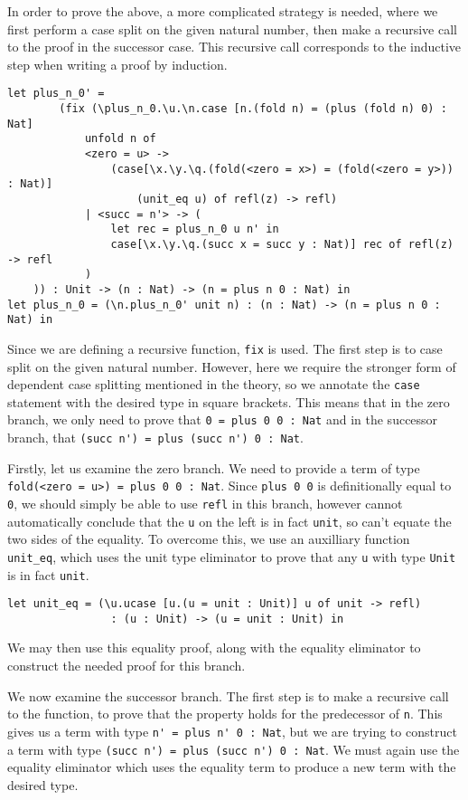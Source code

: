 \documentclass[12pt,a4paper,twoside]{report}
\begin{document}
In order to prove the above, a more complicated strategy is needed, where we first perform a case split on the given natural number, then make a recursive call to the proof in the successor case.
This recursive call corresponds to the inductive step when writing a proof by induction.
\begin{lstlisting}[gobble=4]
    let plus_n_0' =
        (fix (\plus_n_0.\u.\n.case [n.(fold n) = (plus (fold n) 0) : Nat]
            unfold n of
            <zero = u> -> 
                (case[\x.\y.\q.(fold(<zero = x>) = (fold(<zero = y>)) : Nat)]
                    (unit_eq u) of refl(z) -> refl)
            | <succ = n'> -> (
                let rec = plus_n_0 u n' in
                case[\x.\y.\q.(succ x = succ y : Nat)] rec of refl(z) -> refl
            )
    )) : Unit -> (n : Nat) -> (n = plus n 0 : Nat) in
let plus_n_0 = (\n.plus_n_0' unit n) : (n : Nat) -> (n = plus n 0 : Nat) in
\end{lstlisting}
Since we are defining a recursive function, \texttt{fix} is used.
The first step is to case split on the given natural number.
However, here we require the stronger form of dependent case splitting mentioned in the theory, so we annotate the \texttt{case} statement with the desired type in square brackets.
This means that in the zero branch, we only need to prove that \lstinline{0 = plus 0 0 : Nat} and in the successor branch, that \lstinline{(succ n') = plus (succ n') 0 : Nat}.

Firstly, let us examine the zero branch.
We need to provide a term of type \lstinline{fold(<zero = u>) = plus 0 0 : Nat}.
Since \lstinline{plus 0 0} is definitionally equal to \lstinline{0}, we should simply be able to use \lstinline{refl} in this branch, however \pimu{} cannot automatically conclude that the \lstinline{u} on the left is in fact \lstinline{unit}, so can't equate the two sides of the equality.
To overcome this, we use an auxilliary function \lstinline{unit_eq}, which uses the unit type eliminator to prove that any \lstinline{u} with type \lstinline{Unit} is in fact \lstinline{unit}.
\begin{lstlisting}[gobble=4]
    let unit_eq = (\u.ucase [u.(u = unit : Unit)] u of unit -> refl)
                : (u : Unit) -> (u = unit : Unit) in
\end{lstlisting}
We may then use this equality proof, along with the equality eliminator to construct the needed proof for this branch.

We now examine the successor branch.
The first step is to make a recursive call to the function, to prove that the property holds for the predecessor of \lstinline{n}.
This gives us a term with type \lstinline{n' = plus n' 0 : Nat}, but we are trying to construct a term with type \lstinline{(succ n') = plus (succ n') 0 : Nat}.
We must again use the equality eliminator which uses the equality term to produce a new term with the desired type.
\end{document}
